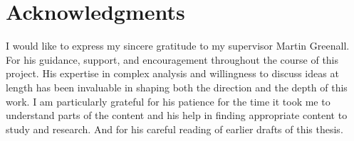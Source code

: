 \chapter{Acknowledgments}
I would like to express my sincere gratitude to my supervisor Martin Greenall. For his guidance, support, and encouragement throughout the course of this project. His expertise in complex analysis and willingness to discuss ideas at length has been invaluable in shaping both the direction and the depth of this work. I am particularly grateful for his patience for the time it took me to understand parts of the content and his help in finding appropriate content to study and research. And for his careful reading of earlier drafts of this thesis.